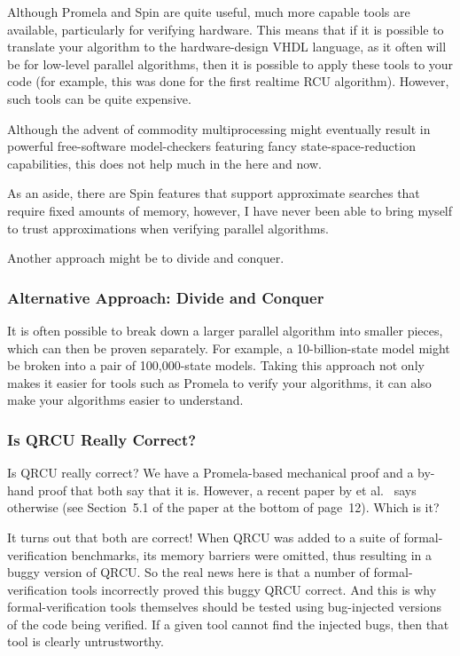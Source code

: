 Although Promela and Spin are quite useful,
much more capable tools are available, particularly for verifying
hardware.
This means that if it is possible to translate your algorithm
to the hardware-design VHDL language, as it often will be for
low-level parallel algorithms, then it is possible to apply these
tools to your code (for example, this was done for the first
realtime RCU algorithm).
However, such tools can be quite expensive.

Although the advent of commodity multiprocessing
might eventually result in powerful free-software model-checkers
featuring fancy state-space-reduction capabilities,
this does not help much in the here and now.

As an aside, there are Spin features that support approximate searches
that require fixed amounts of memory, however, I have never been able
to bring myself to trust approximations when verifying parallel
algorithms.

Another approach might be to divide and conquer.

\subsubsection{Alternative Approach: Divide and Conquer}
\label{sec:formal:Alternative Approach: Divide and Conquer}

It is often possible to break down a larger parallel algorithm into
smaller pieces, which can then be proven separately.
For example, a 10-billion-state model might be broken into a pair
of 100,000-state models.
Taking this approach not only makes it easier for tools such as
Promela to verify your algorithms, it can also make your algorithms
easier to understand.

\subsubsection{Is QRCU Really Correct?}
\label{sec:formal:Is QRCU Really Correct?}

Is QRCU really correct?
We have a Promela-based mechanical proof and a by-hand proof that both
say that it is.
However, a recent paper by  et al.~\cite{JadeAlglave2013-cav}
says otherwise (see Section~5.1 of the paper at the bottom of page~12).
Which is it?

It turns out that both are correct!
When QRCU was added to a suite of formal-verification benchmarks,
its memory barriers were omitted, thus resulting in a buggy version
of QRCU\@.
So the real news here is that a number of formal-verification tools
incorrectly proved this buggy QRCU correct.
And this is why formal-verification tools themselves should be tested
using bug-injected versions of the code being verified.
If a given tool cannot find the injected bugs, then that tool is
clearly untrustworthy.

